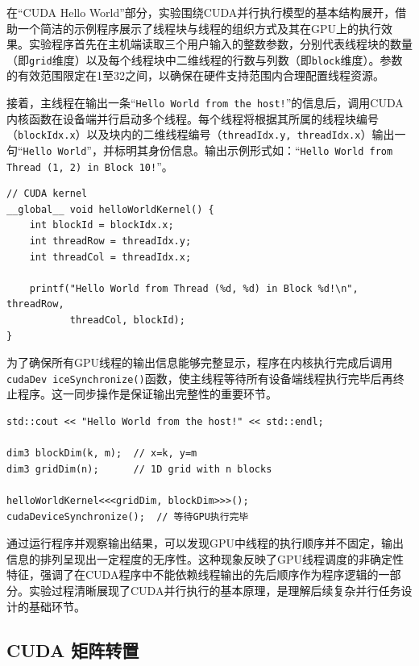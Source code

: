 \documentclass[a4paper, utf8]{ctexart}
\begin{document}
	在“CUDA Hello World”部分，实验围绕CUDA并行执行模型的基本结构展开，借助一个简洁的示例程序展示了线程块与线程的组织方式及其在GPU上的执行效果。实验程序首先在主机端读取三个用户输入的整数参数，分别代表线程块的数量（即\verb|grid|维度）以及每个线程块中二维线程的行数与列数（即\verb|block|维度）。参数的有效范围限定在1至32之间，以确保在硬件支持范围内合理配置线程资源。
	
	接着，主线程在输出一条“\verb|Hello World from the host!|”的信息后，调用CUDA内核函数在设备端并行启动多个线程。每个线程将根据其所属的线程块编号（\verb|blockIdx.x|）以及块内的二维线程编号（\verb|threadIdx.y, threadIdx.x|）输出一句“\verb|Hello World|”，并标明其身份信息。输出示例形式如：“\verb|Hello World from Thread (1, 2) in Block 10!|”。
	
	\begin{verbatim}
// CUDA kernel
__global__ void helloWorldKernel() {
    int blockId = blockIdx.x;
    int threadRow = threadIdx.y;
    int threadCol = threadIdx.x;
    
    printf("Hello World from Thread (%d, %d) in Block %d!\n", threadRow,
           threadCol, blockId);
}
	\end{verbatim}
	
	为了确保所有GPU线程的输出信息能够完整显示，程序在内核执行完成后调用\verb|cudaDev|\ \verb|iceSynchronize()|函数，使主线程等待所有设备端线程执行完毕后再终止程序。这一同步操作是保证输出完整性的重要环节。
	
	\begin{verbatim}
std::cout << "Hello World from the host!" << std::endl;

dim3 blockDim(k, m);  // x=k, y=m
dim3 gridDim(n);      // 1D grid with n blocks

helloWorldKernel<<<gridDim, blockDim>>>();
cudaDeviceSynchronize();  // 等待GPU执行完毕
	\end{verbatim}
	
	通过运行程序并观察输出结果，可以发现GPU中线程的执行顺序并不固定，输出信息的排列呈现出一定程度的无序性。这种现象反映了GPU线程调度的非确定性特征，强调了在CUDA程序中不能依赖线程输出的先后顺序作为程序逻辑的一部分。实验过程清晰展现了CUDA并行执行的基本原理，是理解后续复杂并行任务设计的基础环节。
	
	\subsection{CUDA 矩阵转置}
	
\end{document}

